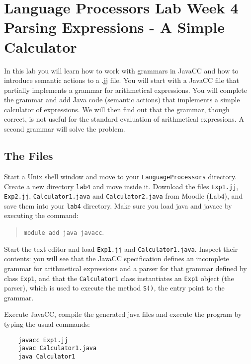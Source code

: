 \documentclass{article}
\begin{document}
\thispagestyle{empty}

\newcommand{\negra}[1]{\textbf{#1}}

\section*{Language Processors Lab Week 4\\
          Parsing Expressions - A Simple Calculator }

\medskip\noindent In this lab you will learn how to work with grammars in JavaCC and how to introduce semantic actions to a .jj file. You will start with a JavaCC file that partially implements a grammar for arithmetical expressions. You will complete the grammar and add Java code (semantic actions) that implements a simple calculator of expressions. We will then find out that the grammar, though correct, is not useful for the standard evaluation of arithmetical expressions. A second grammar will solve the problem.

\subsection*{The Files}

Start a Unix shell window and move to your {\tt LanguageProcessors} directory. Create a new directory {\tt lab4} and move inside it. Download the files {\tt Exp1.jj}, {\tt Exp2.jj}, {\tt Calculator1.java} and {\tt Calculator2.java} from Moodle (Lab4), and save them into  your {\tt lab4} directory. Make sure you load java and javacc by executing the command:

\begin{quote}
{\tt module add java javacc}.
\end{quote}

Start the text editor and load {\tt Exp1.jj} and {\tt Calculator1.java}. Inspect their contents: you will see that the JavaCC specification defines an incomplete grammar for arithmetical expressions and a parser for that grammar defined by class {\tt Exp1}, and that the {\tt Calculator1} class instantiates an {\tt Exp1} object (the parser), which is used to execute the method {\tt S()}, the entry point to the grammar.

Execute JavaCC, compile the generated java files and execute the program by typing the usual commands:

\begin{verbatim}
    javacc Exp1.jj
    javac Calculator1.java
    java Calculator1
\end{verbatim}
\end{document}
